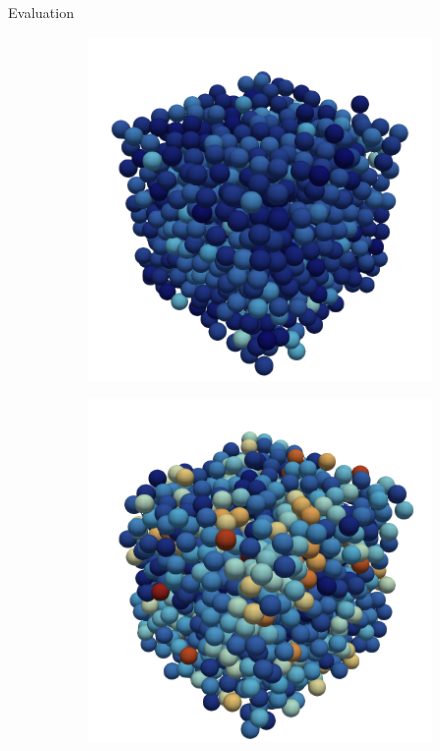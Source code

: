 \begin{frame}[c]{Evaluation}{}
{\begin{figure}[htpb]
\begin{subfigure}[c]{.25\textwidth}
			\end{subfigure}%
			\begin{subfigure}[c]{.25\textwidth}
				\includegraphics[width=\textwidth]{equilibrium/render/t10000.png}
			\end{subfigure}%
			\begin{subfigure}[c]{.25\textwidth}
				\includegraphics[width=\textwidth]{equilibrium/render/t50000.png}

\end{subfigure}
\end{figure}}
\end{frame}
